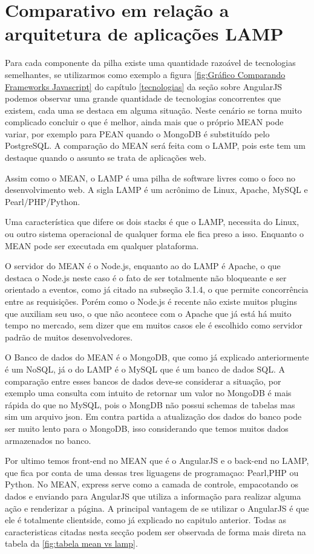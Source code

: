 \section{Comparativo em relação a arquitetura de aplicações LAMP}     
    Para cada componente da pilha existe uma quantidade razoável de tecnologias semelhantes, se utilizarmos  como exemplo a figura \ref{fig:Gráfico Comparando Frameworks Javascript} do capítulo \ref{tecnologias} da seção sobre AngularJS podemos observar uma grande quantidade de tecnologias concorrentes que existem, cada uma se destaca em alguma situação. Neste cenário se torna muito complicado concluir o que é melhor, ainda mais que o próprio MEAN pode variar, por exemplo para PEAN quando o MongoDB é substituído pelo PostgreSQL. 
    A comparação do MEAN será feita com o LAMP, pois este tem um destaque quando o assunto se trata de aplicações web. \cite{meanVSlamp}
   
   Assim como o MEAN, o LAMP é uma pilha de software livres como o foco no desenvolvimento web. A sigla LAMP é um acrônimo de Linux, Apache, MySQL e Pearl/PHP/Python.
   
   Uma característica que difere os dois stacks é que o LAMP, necessita do Linux, ou outro sistema operacional de qualquer forma ele fica preso a isso. Enquanto o MEAN pode ser executada em qualquer plataforma.
   
    O servidor do MEAN é o Node.js, enquanto ao do LAMP é Apache, o que destaca o Node.js neste caso é o fato de ser totalmente não bloqueante e ser orientado a eventos, como já citado na subseção 3.1.4, o que permite concorrência entre as requisições. Porém como o Node.js é recente não existe muitos plugins que auxiliam seu uso, o que não acontece com o Apache que já está há muito tempo  no mercado, sem dizer que em muitos casos ele é escolhido como servidor padrão de muitos desenvolvedores.
    
    O Banco de dados do MEAN é o MongoDB, que como já explicado anteriormente é um NoSQL, já o do LAMP é o MySQL que é um banco de dados SQL. A comparação entre esses bancos de dados deve-se considerar a situação, por exemplo uma consulta com intuito de retornar um valor no MongoDB é mais rápida do que no MySQL, pois o MongDB não possui schemas de tabelas mas sim um arquivo json. Em contra partida a atualização dos dados do banco pode ser muito lento para o MongoDB, isso considerando que temos muitos dados armazenados no banco.
    
    Por ultimo temos front-end no MEAN que é o AngularJS e o back-end no LAMP, que fica por conta de uma dessas tres liguagens de programaçao: Pearl,PHP ou Python. 
    No MEAN, express serve como a camada de controle, empacotando os dados e enviando para AngularJS que utiliza a informação para realizar alguma ação e renderizar a página. A principal vantagem de se utilizar o AngularJS é que ele é totalmente clientside, como já explicado no capitulo anterior.
    Todas as caracteristicas citadas nesta secção podem ser observada de forma mais direta na tabela da \ref{fig:tabela mean vs lamp}.
    
